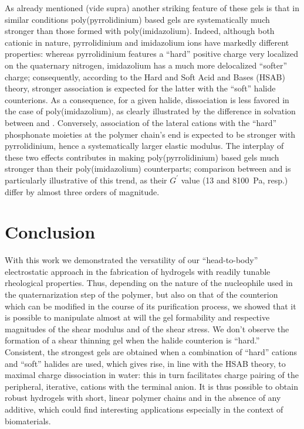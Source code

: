 \documentclass[journal=jacsat,manuscript=article]{achemso}
\begin{document}
As already mentioned (vide supra) another striking feature of these gels is that in similar conditions poly(pyrrolidinium) based gels are systematically much stronger than those formed with poly(imidazolium). Indeed, although both cationic in nature, pyrrolidinium and imidazolium ions have markedly different properties: whereas pyrrolidinium features a ``hard'' positive charge very localized on the quaternary nitrogen, imidazolium has a much more delocalized ``softer'' charge; consequently, according to the Hard and Soft Acid and Bases (HSAB) theory, stronger association is expected for the latter with the ``soft'' halide counterions\cite{Goossens2009}. As a consequence, for a given halide, dissociation is less favored in the case of poly(imidazolium), as clearly illustrated by the difference in solvation between  and . Conversely, association of the lateral cations with the ``hard'' phosphonate moieties at the polymer chain’s end is expected to be stronger with pyrrolidinium, hence a systematically larger elastic modulus. The interplay of these two effects contributes in making poly(pyrrolidinium) based gels much stronger than their poly(imidazolium) counterparts; comparison between  and  is particularly illustrative of this trend, as their $G^\prime$ value (13 and \SI{8100}{\pascal}, resp.) differ by almost three orders of magnitude.

\section{Conclusion}
With this work we demonstrated the versatility of our ``head-to-body'' electrostatic approach in the fabrication of hydrogels with readily tunable rheological properties. Thus, depending on the nature of the nucleophile used in the quaternarization step of the polymer, but also on that of the counterion which can be modified in the course of its purification process, we showed that it is possible to manipulate almost at will the gel formability and respective magnitudes of the shear modulus and of the shear stress. We don’t observe the formation of a shear thinning gel when the halide counterion is ``hard.'' Consistent, the strongest gels are obtained when a combination of ``hard'' cations and ``soft'' halides are used, which gives rise, in line with the HSAB theory, to maximal charge dissociation in water: this in turn facilitates charge pairing of the peripheral, iterative, cations with the terminal anion. It is thus possible to obtain robust hydrogels with short, linear polymer chains and in the absence of any additive, which could find interesting applications especially in the context of biomaterials.
\end{document}
